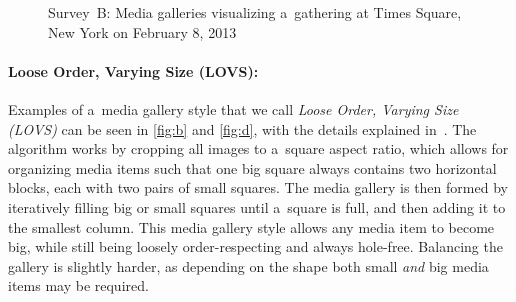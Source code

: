 \begin{figure}[!ht]
  \centering
  \caption[Survey~B: Media galleries visualizing a~gathering at Times Square]{Survey~B: Media galleries visualizing a~gathering at Times Square, New York on February 8, 2013}
  \label{fig:media-gallery2}  
\end{figure}

\paragraph{Loose Order, Varying Size (LOVS):}

Examples of a~media gallery style
that we call \emph{Loose Order, Varying Size (LOVS)}
can be seen in \autoref{fig:b} and \autoref{fig:d},
with the details explained in~\cite{chedeau2012facebook}.
The algorithm works by cropping all images to a~square aspect ratio,
which allows for organizing media items such that one big square always
contains two horizontal blocks, each with two pairs of small squares.
The media gallery is then formed by iteratively filling
big or small squares until a~square is full,
and then adding it to the smallest column.
This media gallery style allows any media item to become big,
while still being loosely order-respecting and always hole-free.
Balancing the gallery is slightly harder,
as depending on the shape both small \emph{and} big
media items may be required.

